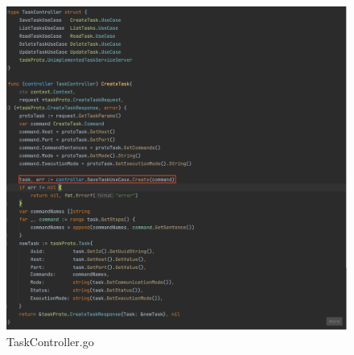 \begin{figure}[H]
    \centering
    \includegraphics[height=0.5\textheight]{./part/Ejecucion/Seguimiento/CreateTaskUseCase/img/PFM - TaskController}
    \caption{TaskController.go}\label{fig:TaskControler}
\end{figure}

